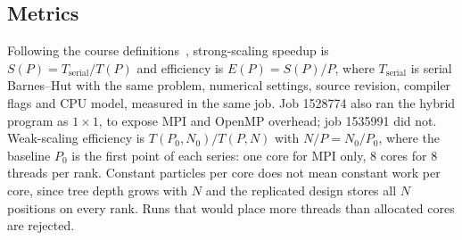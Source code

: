 \documentclass[10pt,a4paper,twocolumn,twoside]{rho-class/rho}
\begin{document}
\subsection{Metrics}
Following the course definitions~\cite{Lecture7}, strong-scaling speedup is $S(P) = T_{\mathrm{serial}}/T(P)$ and efficiency is $E(P) = S(P)/P$, where $T_{\mathrm{serial}}$ is serial Barnes--Hut with the same problem, numerical settings, source revision, compiler flags and CPU model, measured in the same job. Job 1528774 also ran the hybrid program as $1\times1$, to expose MPI and OpenMP overhead; job 1535991 did not. Weak-scaling efficiency is $T(P_0, N_0)/T(P, N)$ with $N/P = N_0/P_0$, where the baseline $P_0$ is the first point of each series: one core for MPI only, 8 cores for 8 threads per rank. Constant particles per core does not mean constant work per core, since tree depth grows with $N$ and the replicated design stores all $N$ positions on every rank. Runs that would place more threads than allocated cores are rejected.
\end{document}
